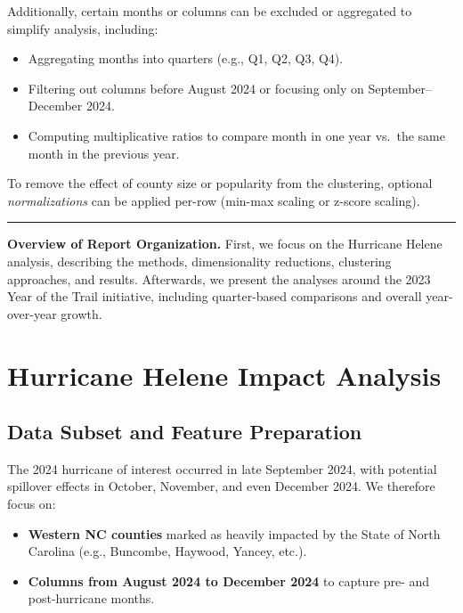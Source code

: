 \documentclass[12pt]{article}
\begin{document}
Additionally, certain months or columns can be excluded or aggregated to simplify analysis, including:
\begin{itemize}
    \item Aggregating months into quarters (e.g., Q1, Q2, Q3, Q4).
    \item Filtering out columns before August 2024 or focusing only on September--December 2024.
    \item Computing multiplicative ratios to compare month in one year vs.\ the same month in the previous year.
\end{itemize}

To remove the effect of county size or popularity from the clustering, optional \emph{normalizations} can be applied per-row (min-max scaling or z-score scaling).

\vspace{0.5cm}
\hrule
\vspace{0.5cm}

\textbf{Overview of Report Organization.} First, we focus on the Hurricane Helene analysis, describing the methods, dimensionality reductions, clustering approaches, and results. Afterwards, we present the analyses around the 2023 Year of the Trail initiative, including quarter-based comparisons and overall year-over-year growth.

\newpage

\section{Hurricane Helene Impact Analysis}
\label{sec:hurricane}

\subsection{Data Subset and Feature Preparation}
The 2024 hurricane of interest occurred in late September 2024, with potential spillover effects in October, November, and even December 2024. We therefore focus on:
\begin{itemize}
    \item \textbf{Western NC counties} marked as heavily impacted by the State of North Carolina (e.g., Buncombe, Haywood, Yancey, etc.).
    \item \textbf{Columns from August 2024 to December 2024} to capture pre- and post-hurricane months.
\end{itemize}
\end{document}
